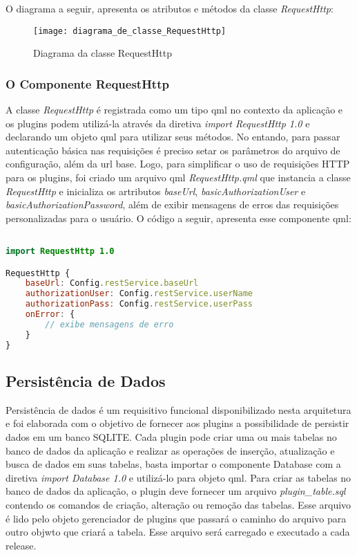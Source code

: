 O diagrama a seguir, apresenta os atributos e métodos da classe \textit{RequestHttp}:

\begin{figure}[h]
	\texttt{[image: diagrama\_de\_classe\_RequestHttp]}
	\centering
	\caption{Diagrama da classe RequestHttp}
\end{figure}


\subsubsection{O Componente RequestHttp}\label{sec:solucao-desenvolvida}
A classe \textit{RequestHttp} é registrada como um tipo qml no contexto da aplicação e os plugins podem utilizá-la através da diretiva \textit{import RequestHttp 1.0} e declarando um objeto qml para utilizar seus métodos. No entando, para passar autenticação básica nas requisições é preciso setar os parâmetros do arquivo de configuração, além da url base. Logo, para simplificar o uso de requisições HTTP para os plugins, foi criado um arquivo qml \textit{RequestHttp.qml} que instancia a classe \textit{RequestHttp} e inicializa os artributos \textit{baseUrl}, \textit{basicAuthorizationUser} e \textit{basicAuthorizationPassword}, além de exibir mensagens de erros das requisições personalizadas para o usuário. O código a seguir, apresenta esse componente qml:

\begin{center}
\begin{lstlisting}[language=qml]

import RequestHttp 1.0 

RequestHttp {
    baseUrl: Config.restService.baseUrl
    authorizationUser: Config.restService.userName
    authorizationPass: Config.restService.userPass
    onError: {
		// exibe mensagens de erro
    }
}
\end{lstlisting}
\end{center}


\subsection{Persistência de Dados}\label{sec:solucao-desenvolvida}
Persistência de dados é um requisitivo funcional disponibilizado nesta arquitetura e foi elaborada com o objetivo de fornecer aos plugins a possibilidade de persistir dados em um banco SQLITE. Cada plugin pode criar uma ou mais tabelas no banco de dados da aplicação e realizar as operações de inserção, atualização e busca de dados em suas tabelas, basta importar o componente Database com a diretiva \textit{import Database 1.0} e utilizá-lo para objeto qml. Para criar as tabelas no banco de dados da aplicação, o plugin deve fornecer um arquivo \textit{plugin\_table.sql} contendo os comandos de criação, alteração ou remoção das tabelas. Esse arquivo é lido pelo objeto gerenciador de plugins que passará o caminho do arquivo para outro objwto que criará a tabela. Esse arquivo será carregado e executado a cada release.\par

